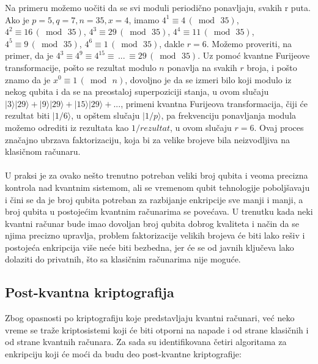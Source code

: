 \documentclass[fleqn, 12pt]{article}
\begin{document}
\begin{text}
Na primeru možemo uočiti da se svi moduli periodično ponavljaju, svakih r puta. Ako je \(p = 5, q = 7, n = 35, x = 4\), imamo \(4^1 \equiv 4\, ( \bmod\, 35)\), \(4^2 \equiv 16\, ( \bmod\, 35)\), \(4^3 \equiv 29\, ( \bmod\, 35)\), \(4^4 \equiv 11\, ( \bmod\, 35)\), \(4^5 \equiv 9\, ( \bmod\, 35)\), \(4^6 \equiv 1\, ( \bmod\, 35)\), dakle \(r = 6\). Možemo proveriti, na primer, da je 
\(4^3 \equiv 4^9 \equiv 4^{15} \equiv \,... \, \equiv 29\, ( \bmod\, 35)\). Uz pomoć kvantne Furijeove transformacije, pošto se rezultat modulo \(n\) ponavlja na svakih \(r\) broja, i pošto znamo da je \(x^0 \equiv 1\, ( \bmod\, n)\), dovoljno je da se izmeri bilo koji modulo iz nekog qubita i da se na preostaloj superpoziciji stanja, u ovom slučaju \(|3\rangle|29\rangle + |9\rangle|29\rangle + |15\rangle|29\rangle + ...\), primeni kvantna Furijeova transformacija, čiji će rezultat biti \(|1/6\rangle\), u opštem slučaju \(|1/p\rangle\), pa frekvenciju ponavljanja modula možemo odrediti iz rezultata kao \(1/rezultat\), u ovom slučaju \(r = 6\). Ovaj proces značajno ubrzava faktorizaciju, koja bi za velike brojeve bila neizvodljiva na klasičnom računaru. \cite{G4}
\\\\

U praksi je za ovako nešto trenutno potreban veliki broj qubita i veoma precizna kontrola nad kvantnim sistemom, ali se vremenom qubit tehnologije poboljšavaju i čini se da je broj qubita potreban za razbijanje enkripcije sve manji i manji, a broj qubita u postojećim kvantnim računarima se povećava. U trenutku kada neki kvantni računar bude imao dovoljan broj qubita dobrog kvaliteta i način da se njima precizno upravlja, problem faktorizacije velikih brojeva će biti lako rešiv i postojeća enkripcija više neće biti bezbedna, jer će se od javnih ključeva lako dolaziti do privatnih, što sa klasičnim računarima nije moguće.
\end{text}

\subsection{Post-kvantna kriptografija}

\begin{text}
Zbog opasnosti po kriptografiju koje predstavljaju kvantni računari, već neko vreme se traže kriptosistemi koji će biti otporni na napade i od strane klasičnih i od strane kvantnih računara. Za sada su identifikovana četiri algoritama za enkripciju koji će moći da budu deo post-kvantne kriptografije: \cite{G6}
\end{text}
\end{document}

